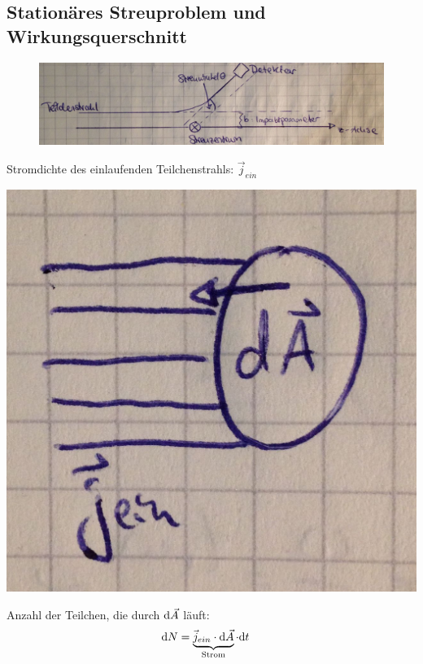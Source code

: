 \subsection{Stationäres Streuproblem und Wirkungsquerschnitt}
	\begin{figure} [h]
		\begin{center}
			\includegraphics[width=12cm]{Stat_Streuproblem_Wirkungsquerschnitt}
		\end{center}
	\end{figure}		
	Stromdichte des einlaufenden Teilchenstrahls: $\vec{j}_{ein}$
	\\

	\begin{minipage}[c]{0.3\textwidth}
				\includegraphics[width=\textwidth]{Stat_Streuproblem_Wirkungsquerschnitt2}
	\end{minipage}
	\hfill
	\begin{minipage}[c]{0.5\textwidth}
	Anzahl der Teilchen, die durch $\mathrm{d} \vec{A}$ läuft:
		\begin{align*}
			\diff N &= 
			\underbrace{\vec{j}_{ein} \cdot \diff \vec{A}}_{\mathclap{\text{Strom}}}
			\cdot \diff t
		\end{align*}
	\end{minipage}
	\\	
	
